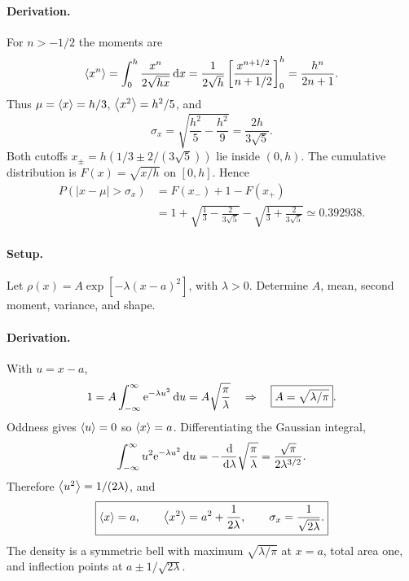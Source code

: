 \paragraph{Derivation.}
For $n>-1/2$ the moments are
\begin{equation}
\left\langle x^n\right\rangle=\int_0^h\frac{x^n}{2\sqrt{hx}}\,\mathrm{d} x
=\frac{1}{2\sqrt h}\left[\frac{x^{n+1/2}}{n+1/2}\right]_0^h
=\frac{h^n}{2n+1}.
\end{equation}
Thus $\mu=\left\langle x\right\rangle=h/3$, $\left\langle x^2\right\rangle=h^2/5$, and
\begin{equation}
\boxed{\sigma_x=\sqrt{\frac{h^2}5-\frac{h^2}9}=\frac{2h}{3\sqrt5}}.
\end{equation}
Both cutoffs $x_{\pm}=h(1/3\pm2/(3\sqrt5))$ lie inside $(0,h)$.
The cumulative distribution is $F(x)=\sqrt{x/h}$ on $[0,h]$. Hence
\begin{align}
P(|x-\mu|>\sigma_x)
&=F(x_-)+1-F(x_+)\\
&=\boxed{1+\sqrt{\frac13-\frac{2}{3\sqrt5}}-
\sqrt{\frac13+\frac{2}{3\sqrt5}}}
\simeq0.392938.
\end{align}

\paragraph{Setup.} Let $\rho(x)=A\exp[-\lambda(x-a)^2]$, with $\lambda>0$. Determine $A$, mean, second moment, variance, and shape.
\paragraph{Derivation.}
With $u=x-a$,
\begin{equation}
1=A\int_{-\infty}^{\infty}\mathrm{e}^{-\lambda u^2}\,\mathrm{d} u
=A\sqrt{\frac{\pi}{\lambda}}
\quad\Rightarrow\quad
\boxed{A=\sqrt{\lambda/\pi}}.
\end{equation}
Oddness gives $\left\langle u\right\rangle=0$ so $\left\langle x\right\rangle=a$. Differentiating the Gaussian integral,
\begin{equation}
\int_{-\infty}^{\infty}u^2\mathrm{e}^{-\lambda u^2}\,\mathrm{d} u
=-\frac{\,\mathrm{d}}{\,\mathrm{d}\lambda}\sqrt{\frac{\pi}{\lambda}}
=\frac{\sqrt\pi}{2\lambda^{3/2}}.
\end{equation}
Therefore $\left\langle u^2\right\rangle=1/(2\lambda)$, and
\begin{equation}
\boxed{\left\langle x\right\rangle=a,\qquad \left\langle x^2\right\rangle=a^2+\frac1{2\lambda},
\qquad \sigma_x=\frac1{\sqrt{2\lambda}}.}
\end{equation}
The density is a symmetric bell with maximum $\sqrt{\lambda/\pi}$ at $x=a$, total area one, and inflection points at $a\pm1/\sqrt{2\lambda}$.

